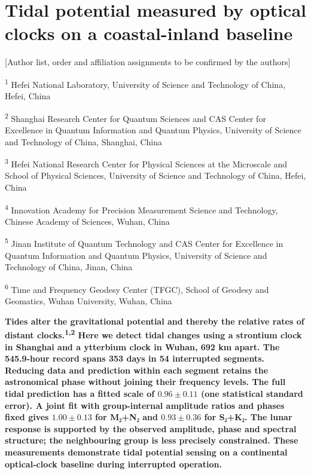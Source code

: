 \documentclass[
  12pt,
  a4paper,
]{article}
\author{}
\date{}
\begin{document}
\hypertarget{tidal-potential-measured-by-optical-clocks-on-a-coastal-inland-baseline}{%
\section{Tidal potential measured by optical clocks on a coastal-inland
baseline}\label{tidal-potential-measured-by-optical-clocks-on-a-coastal-inland-baseline}}

\begingroup\singlespacing

{[}Author list, order and affiliation assignments to be confirmed by the
authors{]}

\textsuperscript{1} Hefei National Laboratory, University of Science and
Technology of China, Hefei, China

\textsuperscript{2} Shanghai Research Center for Quantum Sciences and
CAS Center for Excellence in Quantum Information and Quantum Physics,
University of Science and Technology of China, Shanghai, China

\textsuperscript{3} Hefei National Research Center for Physical Sciences
at the Microscale and School of Physical Sciences, University of Science
and Technology of China, Hefei, China

\textsuperscript{4} Innovation Academy for Precision Measurement Science
and Technology, Chinese Academy of Sciences, Wuhan, China

\textsuperscript{5} Jinan Institute of Quantum Technology and CAS Center
for Excellence in Quantum Information and Quantum Physics, University of
Science and Technology of China, Jinan, China

\textsuperscript{6} Time and Frequency Geodesy Center (TFGC), School of
Geodesy and Geomatics, Wuhan University, Wuhan, China

\endgroup

\textbf{Tides alter the gravitational potential and thereby the relative
rates of distant clocks.\textsuperscript{1,2} Here we detect tidal
changes using a strontium clock in Shanghai and a ytterbium clock in
Wuhan, 692 km apart. The 545.9-hour record spans 353 days in 54
interrupted segments. Reducing data and prediction within each segment
retains the astronomical phase without joining their frequency levels.
The full tidal prediction has a fitted scale of \(0.96\pm0.11\) (one
statistical standard error). A joint fit with group-internal amplitude
ratios and phases fixed gives \(1.00\pm0.13\) for M₂+N₂ and
\(0.93\pm0.36\) for S₂+K₂. The lunar response is supported by the
observed amplitude, phase and spectral structure; the neighbouring group
is less precisely constrained. These measurements demonstrate tidal
potential sensing on a continental optical-clock baseline during
interrupted operation.}
\end{document}
